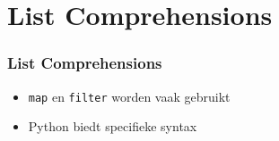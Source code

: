 \section{List Comprehensions}

\frame{\tableofcontents[currentsection]}

\begin{frame}
  \frametitle{List Comprehensions}
  \begin{itemize}
    \item {\tt map} en {\tt filter} worden vaak gebruikt
    \item Python biedt specifieke syntax
  \end{itemize}
  \vskip5mm
  \begin{overprint}
  \end{overprint}
\end{frame}


